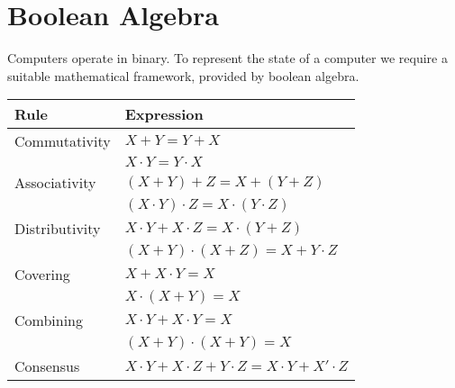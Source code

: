 \section{Boolean Algebra}
Computers operate in binary. To represent the state of a
computer we require a suitable mathematical framework,
provided by boolean algebra.

\begin{table}[h]
    \centering
    \begin{tabular}{|l|l|}
        \hline
        \textbf{Rule}           & \textbf{Expression}                                                                            \\ \hline
        Commutativity           & $X + Y = Y + X$                                                                                \\
                                & $X \cdot Y = Y \cdot X$                                                                        \\ \hline
        Associativity           & $(X + Y) + Z = X + (Y + Z)$                                                                    \\
                                & $(X \cdot Y) \cdot Z = X \cdot (Y \cdot Z)$                                                    \\ \hline
        Distributivity          & $X \cdot Y + X \cdot Z = X \cdot (Y + Z)$                                                      \\
                                & $(X + Y) \cdot (X + Z) = X + Y \cdot Z$                                                        \\ \hline
        Covering                & $X + X \cdot Y = X$                                                                            \\
                                & $X \cdot (X + Y) = X$                                                                          \\ \hline
        Combining               & $X \cdot Y + X \cdot Y = X$                                                                    \\
                                & $(X + Y) \cdot (X + Y) = X$                                                                    \\ \hline
        Consensus               & $X \cdot Y + X \cdot Z + Y \cdot Z = X \cdot Y + X' \cdot Z$                                   \\

\end{tabular}
\end{table}
